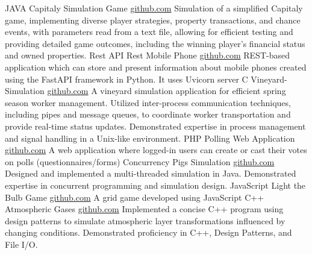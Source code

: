 \documentclass[9pt]{developercv} %
\begin{document}

\begin{entrylist}
    \entry
		{JAVA}
		{Capitaly Simulation Game}
		{\href{https://github.com/afzalaman/Capitaly-Simulation-Game}{github.com}}
		{%
        Simulation of a simplified Capitaly game, implementing diverse player strategies, property transactions, and chance events, with parameters read from a text file, allowing for efficient testing and providing detailed game outcomes, including the winning player's financial status and owned properties.}
    \entry
		{Rest API}
		{Rest Mobile Phone}
		{\href{https://github.com/afzalaman/rest-mobile-phone}
        {github.com}}
		{%
        REST-based application which can store and present information about mobile phones created using the FastAPI framework in Python. It uses Uvicorn server}
	\entry
		{C}
		{Vineyard-Simulation}
        {\href{https://github.com/afzalaman/Vineyard-Simulation}
        {github.com}}
		{A vineyard simulation application for efficient spring season worker management. Utilized inter-process communication techniques, including pipes and message queues, to coordinate worker transportation and provide real-time status updates. Demonstrated expertise in process management and signal handling in a Unix-like environment.}
    \entry
		{PHP}
		{Polling Web Application}
        {\href{https://github.com/afzalaman/Polling-Web-Application}
        {github.com}}
		{A web application where logged-in users can create or cast their votes on polls (questionnaires/forms)}
    \entry
		{Concurrency}
		{Pigs Simulation}
        {\href{https://github.com/afzalaman/pigs-simulation}
        {github.com}}
		{Designed and implemented a multi-threaded simulation in Java. Demonstrated expertise in concurrent programming and simulation design.}
	\entry
		{JavaScript}
		{Light the Bulb Game}
		{\href{https://github.com/afzalaman/Light-the-bulb-Game}
        {github.com}}
		{A grid game developed using JavaScript}
    \entry
		{C++}
		{Atmospheric Gases}
		{\href{https://github.com/afzalaman/Atmospheric-Gases}
        {github.com}}
		{Implemented a concise C++ program using design patterns to simulate atmospheric layer transformations influenced by changing conditions. Demonstrated proficiency in C++, Design Patterns, and File I/O.}

\end{entrylist}
\end{document}
